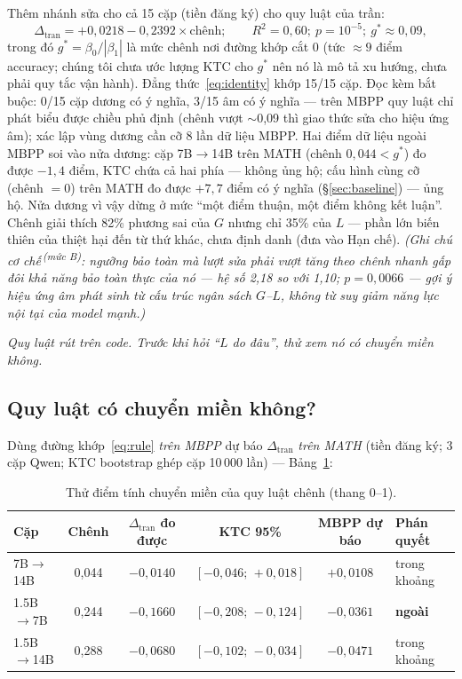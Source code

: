 \documentclass[11pt,a4paper]{article}
\newcommand{\mucB}{\textsuperscript{\,(mức B)}}
\newcommand{\dceil}{\Delta_{\mathrm{tran}}}
\begin{document}
Thêm nhánh sửa cho cả 15 cặp (tiền đăng ký) cho quy luật của trần:
\begin{equation}\label{eq:rule}
\dceil = +0{,}0218 - 0{,}2392 \times \text{chênh};\qquad R^2 = 0{,}60;\ p = 10^{-5};\
g^\ast \approx 0{,}09,
\end{equation}
trong đó $g^\ast = \beta_0/|\beta_1|$ là mức chênh nơi đường khớp cắt 0 (tức $\approx 9$ điểm
accuracy; chúng tôi chưa ước lượng KTC cho $g^\ast$ nên nó là mô tả xu hướng, chưa phải quy tắc
vận hành). Đẳng thức~\eqref{eq:identity} khớp 15/15 cặp. Đọc kèm bắt buộc: 0/15 cặp dương có ý
nghĩa, 3/15 âm có ý nghĩa --- trên MBPP quy luật chỉ phát biểu được chiều phủ định (chênh vượt
$\sim$0,09 thì giao thức sửa cho hiệu ứng âm); xác lập vùng dương cần cỡ 8 lần dữ liệu MBPP.
Hai điểm dữ liệu ngoài MBPP soi vào nửa dương: cặp 7B$\to$14B trên MATH (chênh $0{,}044 <
g^\ast$) đo được $-1{,}4$ điểm, KTC chứa cả hai phía --- không ủng hộ; cấu hình cùng cỡ
(chênh $=0$) trên MATH đo được $+7{,}7$ điểm có ý nghĩa (\S\ref{sec:baseline}) --- ủng hộ. Nửa
dương vì vậy dừng ở mức ``một điểm thuận, một điểm không kết luận''. Chênh giải thích 82\%
phương sai của $G$ nhưng chỉ 35\% của $L$ --- phần lớn biến thiên của thiệt hại đến từ thứ
khác, chưa định danh (đưa vào Hạn chế). \emph{(Ghi chú cơ chế\mucB: ngưỡng bảo toàn mà lượt sửa
phải vượt tăng theo chênh nhanh gấp đôi khả năng bảo toàn thực của nó --- hệ số 2,18 so với
1,10; $p=0{,}0066$ --- gợi ý hiệu ứng âm phát sinh từ cấu trúc ngân sách $G$--$L$, không từ suy
giảm năng lực nội tại của model mạnh.)}

\emph{Quy luật rút trên code. Trước khi hỏi ``$L$ do đâu'', thử xem nó có chuyển miền không.}

\subsection{Quy luật có chuyển miền không?}\label{sec:transfer}

Dùng đường khớp~\eqref{eq:rule} \emph{trên MBPP} dự báo $\dceil$ \emph{trên MATH} (tiền đăng
ký; 3 cặp Qwen; KTC bootstrap ghép cặp 10\,000 lần) --- Bảng~\ref{tab:transfer}:

\begin{table}[t]\centering\small
\begin{tabular}{lccccl}\toprule
Cặp & Chênh & $\dceil$ đo được & KTC 95\% & MBPP dự báo & Phán quyết\\\midrule
7B$\to$14B & 0,044 & $-0{,}0140$ & $[-0{,}046;\,+0{,}018]$ & $+0{,}0108$ & trong khoảng\\
1.5B$\to$7B & 0,244 & $-0{,}1660$ & $[-0{,}208;\,-0{,}124]$ & $-0{,}0361$ & \textbf{ngoài}\\
1.5B$\to$14B & 0,288 & $-0{,}0680$ & $[-0{,}102;\,-0{,}034]$ & $-0{,}0471$ & trong khoảng\\\bottomrule
\end{tabular}
\caption{Thử điểm tính chuyển miền của quy luật chênh (thang 0--1).}
\label{tab:transfer}
\end{table}
\end{document}
